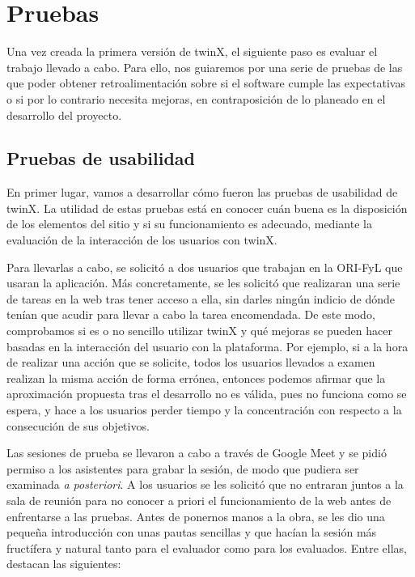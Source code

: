 \chapter{Pruebas}

Una vez creada la primera versión de twinX, el siguiente paso es evaluar el trabajo llevado a cabo. Para ello, nos guiaremos por una serie de pruebas de las que poder obtener retroalimentación sobre si el software cumple las expectativas o si por lo contrario necesita mejoras, en contraposición de lo planeado en el desarrollo del proyecto.

\section{Pruebas de usabilidad}

En primer lugar, vamos a desarrollar cómo fueron las pruebas de usabilidad de twinX. La utilidad de estas pruebas está en conocer cuán buena es la disposición de los elementos del sitio y si su funcionamiento es adecuado, mediante la evaluación de la interacción de los usuarios con twinX.

Para llevarlas a cabo, se solicitó a dos usuarios que trabajan en la ORI-FyL que usaran la aplicación. Más concretamente, se les solicitó que realizaran una serie de tareas en la web tras tener acceso a ella, sin darles ningún indicio de dónde tenían que acudir para llevar a cabo la tarea encomendada. De este modo, comprobamos si es o no sencillo utilizar twinX y qué mejoras se pueden hacer basadas en la interacción del usuario con la plataforma. Por ejemplo, si a la hora de realizar una acción que se solicite, todos los usuarios llevados a examen realizan la misma acción de forma errónea, entonces podemos afirmar que la aproximación propuesta tras el desarrollo no es válida, pues no funciona como se espera, y hace a los usuarios perder tiempo y la concentración con respecto a la consecución de sus objetivos.

Las sesiones de prueba se llevaron a cabo a través de Google Meet \cite{googlemeet} y se pidió permiso a los asistentes para grabar la sesión, de modo que pudiera ser examinada \textit{a posteriori}. A los usuarios se les solicitó que no entraran juntos a la sala de reunión para no conocer a priori el funcionamiento de la web antes de enfrentarse a las pruebas. Antes de ponernos manos a la obra, se les dio una pequeña introducción con unas pautas sencillas \cite{krug} y que hacían la sesión más fructífera y natural tanto para el evaluador como para los evaluados. Entre ellas, destacan las siguientes:

